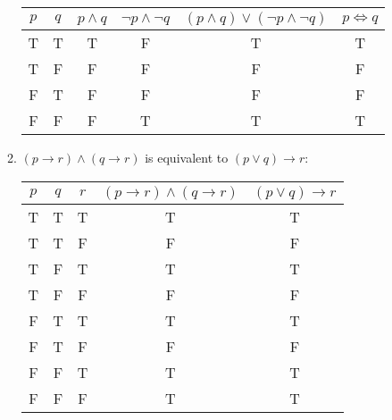 \documentclass{article}
\begin{document}
\begin{enumerate}
\begin{enumerate}
            \begin{tabular}{ |c|c|c|c|c|c| }
                \hline
                $p$  &  $q$  &  $p \land q$  &  $\lnot p \land \lnot q$  &  $(p \land q) \lor (\lnot p \land \lnot q)$  &  $p \iff q$ \\
                \hline
                T    &  T    &  T            &  F                        &  T                                           &  T          \\
                \hline
                T    &  F    &  F            &  F                        &  F                                           &  F          \\
                \hline
                F    &  T    &  F            &  F                        &  F                                           &  F          \\
                \hline
                F    &  F    &  F            &  T                        &  T                                           &  T          \\
                \hline
            \end{tabular}
        \item $(p \to r) \land (q \to r)$ is equivalent to $(p \lor q) \to r$: \\
            \begin{tabular}{ |c|c|c|c|c| }
                \hline
                $p$ &   $q$ &   $r$ &   $(p \to r) \land (q \to r)$ &   $(p \lor q) \to r$ \\
                \hline
                T   &   T   &   T   &   T   &   T   \\                                                                      
                \hline
                T   &   T   &   F   &   F   &   F   \\
                \hline
                T   &   F   &   T   &   T   &   T   \\
                \hline
                T   &   F   &   F   &   F   &   F   \\
                \hline
                F   &   T   &   T   &   T   &   T   \\
                \hline
                F   &   T   &   F   &   F   &   F   \\
                \hline
                F   &   F   &   T   &   T   &   T   \\
                \hline
                F   &   F   &   F   &   T   &   T   \\
                \hline

\end{tabular}
\end{enumerate}
\end{enumerate}
\end{document}
